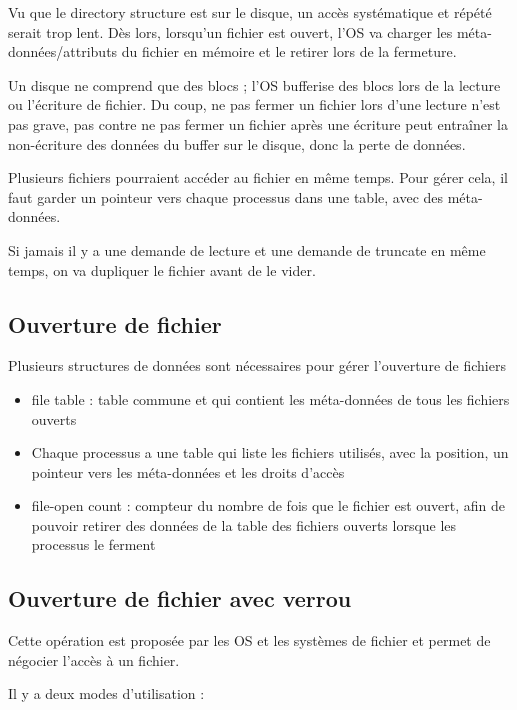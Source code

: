 Vu que le directory structure est sur le disque, un accès systématique et répété serait trop lent. Dès lors, lorsqu'un fichier est ouvert, l'OS va charger les méta-données/attributs du fichier en mémoire et le retirer lors de la fermeture.

Un disque ne comprend que des blocs ; l'OS bufferise des blocs lors de la lecture ou l'écriture de fichier. Du coup, ne pas fermer un fichier lors d'une lecture n'est pas grave, pas contre ne pas fermer un fichier après une écriture peut entraîner la non-écriture des données du buffer sur le disque, donc la perte de données.

Plusieurs fichiers pourraient accéder au fichier en même temps. Pour gérer cela, il faut garder un pointeur vers chaque processus dans une table, avec des méta-données.

Si jamais il y a une demande de lecture et une demande de truncate en même temps, on va dupliquer le fichier avant de le vider.

	\subsection{Ouverture de fichier}
	
	Plusieurs structures de données sont nécessaires pour gérer l'ouverture de fichiers
	
	\begin{itemize}
		
		\item file table : table commune et qui contient les méta-données de tous les fichiers ouverts
		\item Chaque processus a une table qui liste les fichiers utilisés, avec la position, un pointeur vers les méta-données et les droits d'accès
		\item file-open count : compteur du nombre de fois que le fichier est ouvert, afin de pouvoir retirer des données de la table des fichiers ouverts lorsque les processus le ferment
	\end{itemize}
	
	\subsection{Ouverture de fichier avec verrou}
	
	Cette opération est proposée par les OS et les systèmes de fichier et permet de négocier l'accès à un fichier.
	
	Il y a deux modes d'utilisation :
	
